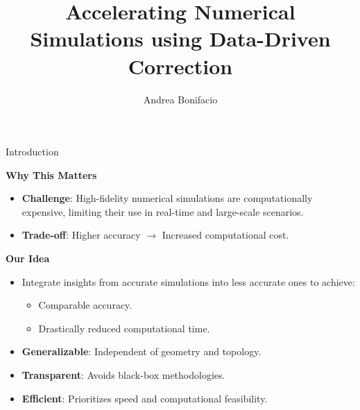 \documentclass{beamer}
\title{Accelerating Numerical Simulations using Data-Driven Correction}
\author{Andrea Bonifacio}
\begin{document}
\begin{frame}
\titlepage
\end{frame}


\begin{frame}{Introduction}

    \textbf{Why This Matters}
    \begin{itemize}
        \item \textbf{Challenge}: High-fidelity numerical simulations are computationally expensive, limiting their use in real-time and large-scale scenarios.
        \item \textbf{Trade-off}: Higher accuracy $\rightarrow$ Increased computational cost.
    \end{itemize}
    
    \vspace{0.5cm}
    
    \textbf{Our Idea}
    \begin{itemize}
        \item Integrate insights from accurate simulations into less accurate ones to achieve:
        \begin{itemize}
            \item Comparable accuracy.
            \item Drastically reduced computational time.
        \end{itemize}
    \end{itemize}
    
    \vspace{0.5cm}
    
    \begin{itemize}
        \item \textbf{Generalizable}: Independent of geometry and topology.
        \item \textbf{Transparent}: Avoids black-box methodologies.
        \item \textbf{Efficient}: Prioritizes speed and computational feasibility.
    \end{itemize}
    
    \vspace{0.5cm}
    
    \end{frame}
\end{document}
